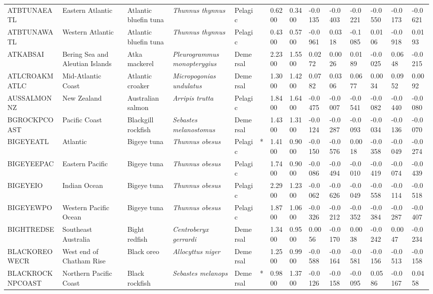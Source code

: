 \begin{longtable}{p{2.6cm}p{1.9cm}p{1.7cm}p{1.6cm}p{1cm}p{0.3cm}p{1cm}p{1cm}p{1cm}p{1.1cm}p{1cm}p{1.1cm}p{1cm}p{1.1cm}}
  ATBTUNAEATL & Eastern Atlantic & Atlantic bluefin tuna & \textit{Thunnus thynnus} & Pelagic &   & 0.6200 & 0.3400 & -0.0135 & -0.0403 & -0.0221 & -0.0550 & -0.0173 & -0.0621 \\ 
  ATBTUNAWATL & Western Atlantic & Atlantic bluefin tuna & \textit{Thunnus thynnus} & Pelagic &   & 0.4300 & 0.5700 & -0.0961 & 0.0318 & -0.1085 & 0.0106 & -0.0918 & 0.0193 \\ 
  ATKABSAI & Bering Sea and Aleutian Islands & Atka mackerel & \textit{Pleurogrammus monopterygius} & Demersal &   & 2.2300 & 1.5500 & 0.0272 & 0.0026 & 0.0189 & -0.0025 & 0.0648 & -0.0215 \\ 
  ATLCROAKMATLC & Mid-Atlantic Coast & Atlantic croaker & \textit{Micropogonias undulatus} & Demersal &   & 1.3000 & 1.4200 & 0.0782 & 0.0306 & 0.0677 & 0.0034 & 0.0952 & 0.0092 \\ 
  AUSSALMONNZ & New Zealand & Australian salmon & \textit{Arripis trutta} & Pelagic &   & 1.8400 & 1.6400 & -0.0475 & -0.0007 & -0.0541 & -0.0082 & -0.0440 & -0.0080 \\ 
  BGROCKPCOAST & Pacific Coast & Blackgill rockfish & \textit{Sebastes melanostomus} & Demersal &   & 1.4300 & 1.3100 & -0.0124 & -0.0287 & -0.0093 & -0.0034 & -0.0136 & -0.0070 \\ 
  BIGEYEATL & Atlantic & Bigeye tuna & \textit{Thunnus obesus} & Pelagic & * & 1.4100 & 0.9000 & -0.0150 & -0.0576 & 0.0018 & -0.0358 & -0.0049 & -0.0274 \\ 
  BIGEYEEPAC & Eastern Pacific & Bigeye tuna & \textit{Thunnus obesus} & Pelagic &   & 1.7400 & 0.9000 & -0.0086 & -0.0494 & -0.0010 & -0.0419 & -0.0074 & -0.0439 \\ 
  BIGEYEIO & Indian Ocean & Bigeye tuna & \textit{Thunnus obesus} & Pelagic &   & 2.2900 & 1.2300 & -0.0062 & -0.0626 & -0.0049 & -0.0558 & -0.0114 & -0.0518 \\ 
  BIGEYEWPO & Western Pacific Ocean & Bigeye tuna & \textit{Thunnus obesus} & Pelagic &   & 1.8700 & 1.0600 & -0.0326 & -0.0212 & -0.0352 & -0.0384 & -0.0287 & -0.0407 \\ 
  BIGHTREDSE & Southeast Australia & Bight redfish & \textit{Centroberyx gerrardi} & Demersal &   & 1.3400 & 0.9500 & 0.0056 & -0.0170 & 0.0038 & -0.0242 & 0.0047 & -0.0234 \\ 
  BLACKOREOWECR & West end of Chatham Rise & Black oreo & \textit{Allocyttus niger} & Demersal &   & 1.2500 & 0.9900 & -0.0588 & -0.0164 & -0.0581 & -0.0156 & -0.0513 & -0.0158 \\ 
  BLACKROCKNPCOAST & Northern Pacific Coast & Black rockfish & \textit{Sebastes melanops} & Demersal & * & 0.9800 & 1.3700 & -0.0126 & -0.0158 & -0.0095 & 0.0586 & -0.0167 & 0.0458 \\ 

\end{longtable}
